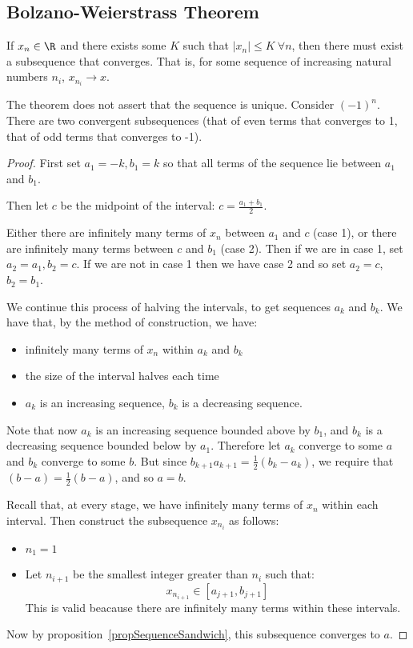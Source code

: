 \documentclass[../Main.tex]{subfiles}
\begin{document}
\subsection{Bolzano-Weierstrass Theorem}
\begin{theorem}
    If $x_n \in \R$ and there exists some $K$ such that $|x_n| \leq K~\forall n$, then there must exist a subsequence that converges. That is, for some sequence of increasing natural numbers $n_i$, $x_{n_i} \rightarrow x$.
    \label{thmBolzanoWeierstrass}
\end{theorem}
\begin{remark}
    The theorem does not assert that the sequence is unique. Consider $(-1)^n$. There are two convergent subsequences (that of even terms that converges to 1, that of odd terms that converges to -1).
\end{remark}
\begin{proof}
    First set $a_1 = -k, b_1 = k$ so that all terms of the sequence lie between $a_1$ and $b_1$.\par
    Then let $c$ be the midpoint of the interval: $c = \frac{a_1 + b_1}{2}$.\par
    Either there are infinitely many terms of $x_n$ between $a_1$ and $c$ (case 1), or there are infinitely many terms between $c$ and $b_1$ (case 2).
    Then if we are in case 1, set $a_2 = a_1, b_2 = c$. If we are not in case 1 then we have case 2 and so set $a_2 = c$, $b_2 = b_1$.\par
    We continue this process of halving the intervals, to get sequences $a_k$ and $b_k$. We have that, by the method of construction, we have:
    \begin{itemize}
        \item infinitely many terms of $x_n$ within $a_k$ and $b_k$
        \item the size of the interval halves each time
        \item $a_k$ is an increasing sequence, $b_k$ is a decreasing sequence.
    \end{itemize}
    Note that now $a_k$ is an increasing sequence bounded above by $b_1$, and $b_k$ is a decreasing sequence bounded below by $a_1$. Therefore let $a_k$ converge to some $a$ and $b_k$ converge to some $b$. But since $b_{k+1} a_{k + 1} = \frac{1}{2}(b_k - a_k)$, we require that $(b - a) = \frac{1}{2}(b - a)$, and so $a = b$.\par
    Recall that, at every stage, we have infinitely many terms of $x_n$ within each interval. Then construct the subsequence $x_{n_i}$ as follows:
    \begin{itemize}
        \item $n_1 = 1$
        \item Let $n_{i + 1}$ be the smallest integer greater than $n_i$ such that:
            \begin{equation*}
                x_{n_{i+1}} \in [a_{j + 1}, b_{j + 1}]
            \end{equation*}
            This is valid beacause there are infinitely many terms within these intervals.
    \end{itemize}
    Now by proposition~\ref{propSequenceSandwich}, this subsequence converges to $a$.
\end{proof}
\end{document}
